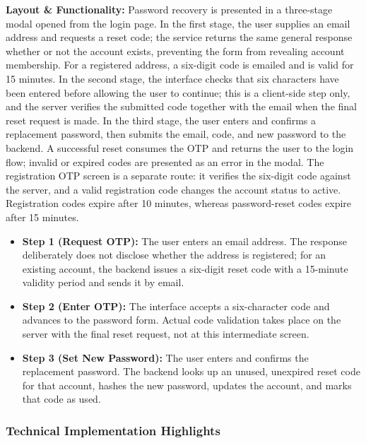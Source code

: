 \textbf{Layout \& Functionality:} Password recovery is presented in a three-stage modal opened from the login page. In the first stage, the user supplies an email address and requests a reset code; the service returns the same general response whether or not the account exists, preventing the form from revealing account membership. For a registered address, a six-digit code is emailed and is valid for 15 minutes. In the second stage, the interface checks that six characters have been entered before allowing the user to continue; this is a client-side step only, and the server verifies the submitted code together with the email when the final reset request is made. In the third stage, the user enters and confirms a replacement password, then submits the email, code, and new password to the backend. A successful reset consumes the OTP and returns the user to the login flow; invalid or expired codes are presented as an error in the modal. The registration OTP screen is a separate route: it verifies the six-digit code against the server, and a valid registration code changes the account status to active. Registration codes expire after 10 minutes, whereas password-reset codes expire after 15 minutes.
\begin{itemize}
    \item \textbf{Step 1 (Request OTP):} The user enters an email address. The response deliberately does not disclose whether the address is registered; for an existing account, the backend issues a six-digit reset code with a 15-minute validity period and sends it by email.
    \item \textbf{Step 2 (Enter OTP):} The interface accepts a six-character code and advances to the password form. Actual code validation takes place on the server with the final reset request, not at this intermediate screen.
    \item \textbf{Step 3 (Set New Password):} The user enters and confirms the replacement password. The backend looks up an unused, unexpired reset code for that account, hashes the new password, updates the account, and marks that code as used.
\end{itemize}

\subsubsection{Technical Implementation Highlights}


